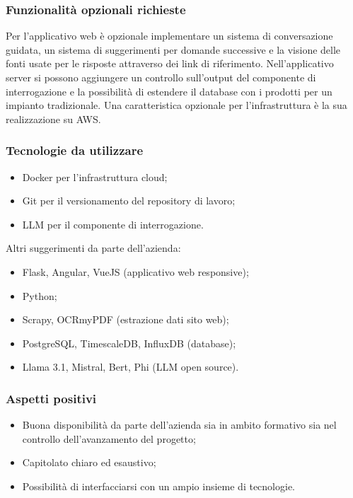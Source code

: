 \documentclass[10pt]{article}
\begin{document}
\subsubsection{Funzionalità opzionali richieste}
Per l’applicativo web è opzionale implementare un sistema di conversazione guidata, un sistema di suggerimenti per domande successive e la visione delle fonti usate per le risposte attraverso dei link di riferimento. Nell’applicativo server si possono aggiungere un controllo sull’output del componente di interrogazione e la possibilità di estendere il database con i prodotti per un impianto tradizionale.
Una caratteristica opzionale per l’infrastruttura è la sua realizzazione su AWS.

\subsubsection{Tecnologie da utilizzare}
\begin{itemize}
\item Docker per l’infrastruttura cloud;
\item Git per il versionamento del repository di lavoro;
\item LLM per il componente di interrogazione.
\end{itemize}
Altri suggerimenti da parte dell’azienda:
\begin{itemize}
\item Flask, Angular, VueJS (applicativo web responsive);
\item Python;
\item Scrapy, OCRmyPDF (estrazione dati sito web);
\item PostgreSQL, TimescaleDB, InfluxDB (database);
\item Llama 3.1, Mistral, Bert, Phi (LLM open source).
\end{itemize}

\subsubsection{Aspetti positivi}
\begin{itemize}
\item Buona disponibilità da parte dell’azienda sia in ambito formativo sia nel controllo dell’avanzamento del progetto;
\item Capitolato chiaro ed esaustivo;
\item Possibilità di interfacciarsi con un ampio insieme di tecnologie.

\end{itemize}
\end{document}
